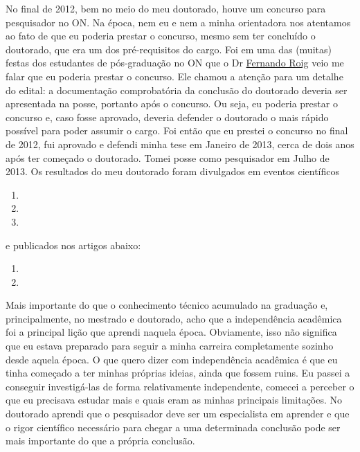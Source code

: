 \noindent No final de 2012, bem no meio do meu doutorado, houve um concurso para pesquisador no ON.
Na época, nem eu e nem a minha orientadora nos atentamos ao fato de que eu poderia 
prestar o concurso, mesmo sem ter concluído o doutorado, que era um dos pré-requisitos do
cargo. Foi em uma das (muitas) festas dos estudantes de pós-graduação no ON que
o Dr \href{https://lattes.cnpq.br/5822763057370791}{Fernando Roig} veio me falar que eu poderia prestar o concurso.
Ele chamou a atenção para um detalhe do edital: a documentação comprobatória da conclusão 
do doutorado deveria ser apresentada na posse, portanto após o concurso. 
Ou seja, eu poderia prestar o concurso e, caso fosse aprovado, deveria defender o doutorado
o mais rápido possível para poder assumir o cargo.
Foi então que eu prestei o concurso no final de 2012, fui aprovado e defendi minha tese em
Janeiro de 2013, cerca de dois anos após ter começado o doutorado. 
Tomei posse como pesquisador
em Julho de 2013. Os resultados do meu doutorado foram divulgados em eventos científicos
\begin{enumerate}
	\item {}
	\item {}
	\item {}
\end{enumerate}
\noindent e publicados nos artigos abaixo:
\begin{enumerate}
	\item {}
	\item {}
\end{enumerate}

\bigskip

\noindent Mais importante do que o conhecimento técnico acumulado na graduação e, 
principalmente, no mestrado e doutorado, acho que a independência acadêmica 
foi a principal lição que aprendi naquela época.
Obviamente, isso não significa que eu estava preparado para seguir a minha 
carreira completamente sozinho desde aquela época. O que quero dizer com 
independência acadêmica é que eu tinha começado a ter minhas próprias ideias,
ainda que fossem ruins. Eu passei a conseguir investigá-las de forma 
relativamente independente, comecei a perceber o que eu precisava estudar 
mais e quais eram as minhas principais limitações.
No doutorado aprendi que o pesquisador deve ser um especialista em aprender
e que o rigor científico necessário para chegar a uma determinada conclusão pode ser
mais importante do que a própria conclusão.
